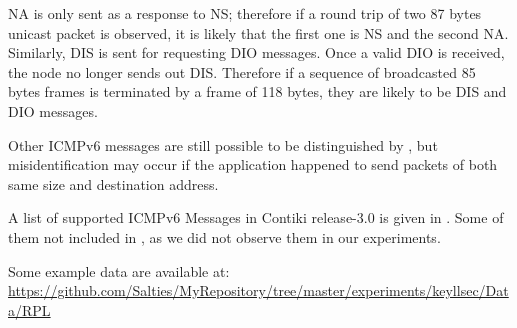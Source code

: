 NA is only sent as a response to NS; therefore if a round trip of two 87 bytes unicast packet is observed, it is likely that the first one is NS and the second NA. Similarly, DIS is sent for requesting DIO messages.  Once a valid DIO is received, the node no longer sends out DIS. Therefore if a sequence of broadcasted 85 bytes frames is terminated by a frame of 118 bytes, they are likely to be DIS and DIO messages.

Other ICMPv6 messages are still possible to be distinguished by , but misidentification may occur if the application happened to send packets of both same size and destination address.

A list of supported ICMPv6 Messages in Contiki release-3.0 is given in . Some of them not included in , as we did not observe them in our experiments.

Some example data are available at:\\
\url{https://github.com/Salties/MyRepository/tree/master/experiments/keyllsec/Data/RPL}





